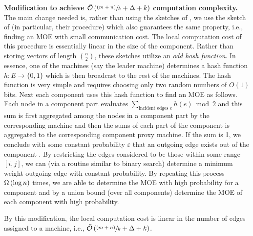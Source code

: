 \noindent \textbf{Modification to achieve $\tilde{\mathcal{O}}\left(\sfrac{(m+n)}{k} + \Delta + k\right)$ computation complexity.}
The main change needed is, rather than using the sketches of \cite{JowhariST11,McGregor14},
we use the sketch of \cite{KingKT15} (in particular, their  procedure) which also guarantees the same property, i.e., 
finding an MOE with small communication cost. The local computation cost of this procedure
is essentially linear in the size of the component. Rather than storing vectors
of length $\binom{n}{2}$, these sketches utilize an \emph{odd hash function}. In
essence, one of the machines (say the leader machine) determines a
hash function $h:E \to \{0, 1\}$ which is then broadcast to the rest of the
machines.  The hash function is very simple and requires choosing
only two random numbers of $O(1)$ bits\cite{KingKT15}. Next each component
uses this hash function to find an MOE as follows.
Each node in a component part   evaluates $\sum_{\text{incident edges } e} h(e)
\bmod{2}$ and this sum is  first aggregated among the nodes in a component part
by the corresponding machine and then the sums of each part of the component
is aggregated   to the corresponding component proxy machine. 
If the sum is 1, we conclude with some constant probability
$\varepsilon$ that an outgoing edge exists out of the component \cite{KingKT15}. By restricting the edges considered
to be those within some range $[i, j]$, we can (via a routine similar to binary
search) determine a minimum weight outgoing edge with constant probability. By
repeating this process $\Omega\left(\log{n}\right)$ times, we are able to determine the MOE
with high probability for a component and by a union bound (over all components)
determine the MOE of each component with high probability.

By this modification, the local computation cost is linear in the number of edges
assigned to a machine, i.e.,
$\tilde{\mathcal{O}}\left(\sfrac{(m+n)}{k} +\Delta + k\right)$.

